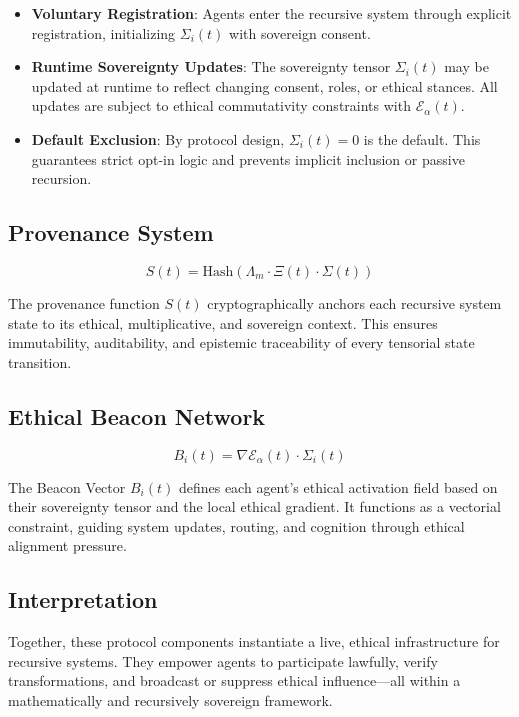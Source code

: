 \documentclass[12pt]{article}
\begin{document}
\begin{itemize}
  \item \textbf{Voluntary Registration}: Agents enter the recursive system through explicit registration, initializing $\Sigma_i(t)$ with sovereign consent.
  \item \textbf{Runtime Sovereignty Updates}: The sovereignty tensor $\Sigma_i(t)$ may be updated at runtime to reflect changing consent, roles, or ethical stances. All updates are subject to ethical commutativity constraints with $\mathcal{E}_\alpha(t)$.
  \item \textbf{Default Exclusion}: By protocol design, $\Sigma_i(t) = 0$ is the default. This guarantees strict opt-in logic and prevents implicit inclusion or passive recursion.
\end{itemize}

\subsection{Provenance System}

\[
S(t) = \text{Hash}(\Lambda_m \cdot \Xi(t) \cdot \Sigma(t))
\]

The provenance function $S(t)$ cryptographically anchors each recursive system state to its ethical, multiplicative, and sovereign context. This ensures immutability, auditability, and epistemic traceability of every tensorial state transition.

\subsection{Ethical Beacon Network}

\[
B_i(t) = \nabla \mathcal{E}_\alpha(t) \cdot \Sigma_i(t)
\]

The Beacon Vector $B_i(t)$ defines each agent's ethical activation field based on their sovereignty tensor and the local ethical gradient. It functions as a vectorial constraint, guiding system updates, routing, and cognition through ethical alignment pressure.

\subsection*{Interpretation}

Together, these protocol components instantiate a live, ethical infrastructure for recursive systems. They empower agents to participate lawfully, verify transformations, and broadcast or suppress ethical influence—all within a mathematically and recursively sovereign framework.
\end{document}
